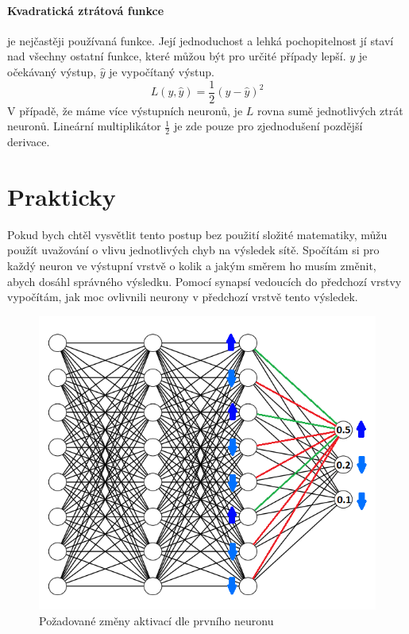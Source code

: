 \documentclass[12pt,a4paper]{report}
\begin{document}
	\paragraph{Kvadratická ztrátová funkce}
	je nejčastěji používaná funkce. Její jednoduchost a lehká pochopitelnost jí staví nad všechny ostatní funkce, které můžou být pro určité případy lepší. $y$ je očekávaný výstup, $\hat{y}$ je vypočítaný výstup.
	$$L(y,\hat{y})=\frac{1}{2}(y-\hat{y})^2$$
	V případě, že máme více výstupních neuronů, je $L$ rovna sumě jednotlivých ztrát neuronů. Lineární multiplikátor $\frac{1}{2}$ je zde pouze pro zjednodušení pozdější derivace.
	
	\section{Prakticky}
	Pokud bych chtěl vysvětlit tento postup bez použití složité matematiky, můžu použít uvažování o vlivu jednotlivých chyb na výsledek sítě. Spočítám si pro každý neuron ve výstupní vrstvě o kolik a jakým směrem ho musím změnit, abych dosáhl správného výsledku. Pomocí synapsí vedoucích do předchozí vrstvy vypočítám, jak moc ovlivnili neurony v předchozí vrstvě tento výsledek.
	
	\begin{figure}[h]
		\centering
		\includegraphics[width=15cm]{images/nn8-8-8-3_krok_1}
		\caption{Požadované změny aktivací dle prvního neuronu}
	\end{figure}
	
\end{document}
